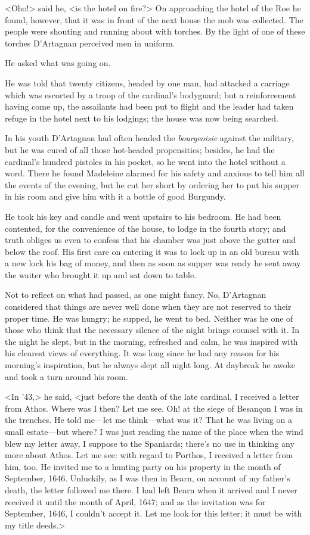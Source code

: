 <Oho!> said he, <is the hotel on fire?> On approaching the hotel of the Roe he found, however, that it was in front of the next house the mob was collected. The people were shouting and running about with torches. By the light of one of these torches D'Artagnan perceived men in uniform.

He asked what was going on.

He was told that twenty citizens, headed by one man, had attacked a carriage which was escorted by a troop of the cardinal's bodyguard; but a reinforcement having come up, the assailants had been put to flight and the leader had taken refuge in the hotel next to his lodgings; the house was now being searched.

In his youth D'Artagnan had often headed the \textit{bourgeoisie} against the military, but he was cured of all those hot-headed propensities; besides, he had the cardinal's hundred pistoles in his pocket, so he went into the hotel without a word. There he found Madeleine alarmed for his safety and anxious to tell him all the events of the evening, but he cut her short by ordering her to put his supper in his room and give him with it a bottle of good Burgundy.

He took his key and candle and went upstairs to his bedroom. He had been contented, for the convenience of the house, to lodge in the fourth story; and truth obliges us even to confess that his chamber was just above the gutter and below the roof. His first care on entering it was to lock up in an old bureau with a new lock his bag of money, and then as soon as supper was ready he sent away the waiter who brought it up and sat down to table.

Not to reflect on what had passed, as one might fancy. No, D'Artagnan considered that things are never well done when they are not reserved to their proper time. He was hungry; he supped, he went to bed. Neither was he one of those who think that the necessary silence of the night brings counsel with it. In the night he slept, but in the morning, refreshed and calm, he was inspired with his clearest views of everything. It was long since he had any reason for his morning's inspiration, but he always slept all night long. At daybreak he awoke and took a turn around his room.

<In '43,> he said, <just before the death of the late cardinal, I received a letter from Athos. Where was I then? Let me see. Oh! at the siege of Besançon I was in the trenches. He told me—let me think—what was it? That he was living on a small estate—but where? I was just reading the name of the place when the wind blew my letter away, I suppose to the Spaniards; there's no use in thinking any more about Athos. Let me see: with regard to Porthos, I received a letter from him, too. He invited me to a hunting party on his property in the month of September, 1646. Unluckily, as I was then in Bearn, on account of my father's death, the letter followed me there. I had left Bearn when it arrived and I never received it until the month of April, 1647; and as the invitation was for September, 1646, I couldn't accept it. Let me look for this letter; it must be with my title deeds.>

